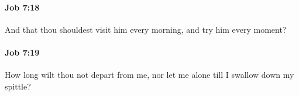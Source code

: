 		\paragraph{Job 7:18} %
			\label{JOB-7-18}

			And that thou shouldest visit him every morning, and try him every moment?


		\paragraph{Job 7:19} %
			\label{JOB-7-19}

			How long wilt thou not depart from me, nor let me alone till I swallow down my spittle?


